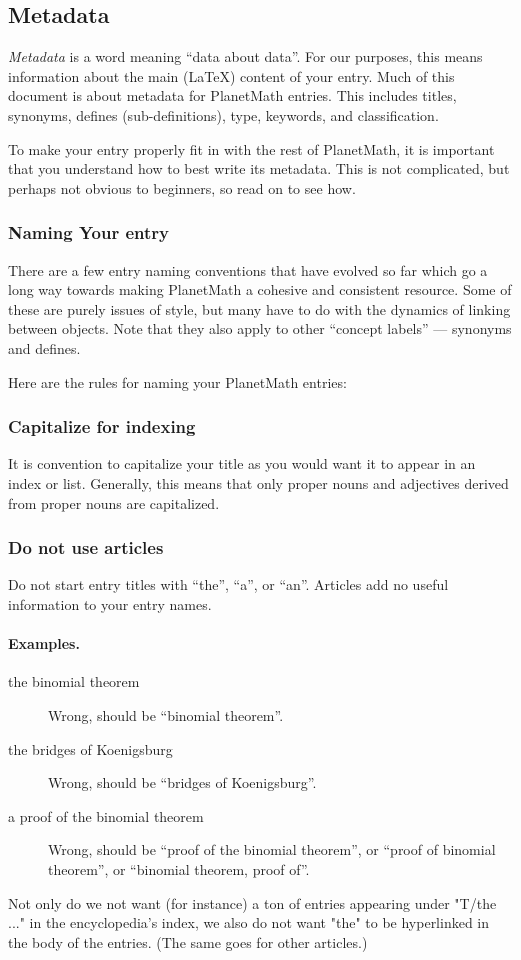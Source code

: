 \subsection*{Metadata}
\textit{Metadata} is a word meaning ``data about data''. For our
purposes, this means information about the main (\LaTeX) content of
your entry. Much of this document is about metadata for PlanetMath
entries. This includes titles, synonyms, defines (sub-definitions),
type, keywords, and classification.

To make your entry properly fit in with the rest of PlanetMath, it is
important that you understand how to best write its metadata. This is
not complicated, but perhaps not obvious to beginners, so read on to
see how.


\subsubsection*{Naming Your entry}
There are a few entry naming conventions that have evolved so far
which go a long way towards making PlanetMath a cohesive and
consistent resource. Some of these are purely issues of style, but
many have to do with the dynamics of linking between objects. Note that
they also apply to other ``concept labels'' --- synonyms and defines.

Here are the rules for naming your PlanetMath entries:

\subsubsection{Capitalize for indexing}
It is convention to capitalize your title as you would want it to appear in an index or list. Generally, this means that only proper nouns and adjectives derived from proper nouns are capitalized.

\subsubsection{Do not use articles}
Do not start entry titles with ``the'', ``a'', or ``an''. Articles add
no useful information to your entry names.

\paragraph{Examples.}
\begin{description}
\item[the binomial theorem]
Wrong, should be ``binomial theorem''.
\item[the bridges of Koenigsburg]
Wrong, should be ``bridges of Koenigsburg''.
\item[a proof of the binomial theorem] Wrong, should be ``proof of the
binomial theorem'', or ``proof of binomial theorem'', or ``binomial
theorem, proof of''.
\end{description}
Not only do we not want (for instance) a ton of entries appearing
under "T/the ..." in the encyclopedia's index, we also do not want
"the" to be hyperlinked in the body of the entries. (The same goes
for other articles.)

